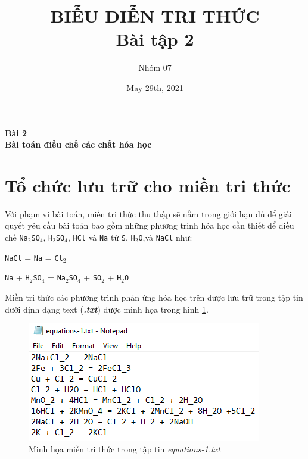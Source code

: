 \documentclass[a4paper]{article}
\title{BIỄU DIỄN TRI THỨC\\ Bài tập 2}
\author{Nhóm 07}
\date{May 29th, 2021}
\begin{document}
	\maketitle
	\begin{center}
		\LARGE{\textbf{Bài 2\\Bài toán điều chế các chất hóa học}}
	\end{center}
	
	\section{Tổ chức lưu trữ cho miền tri thức} 	
	
	Với phạm vi bài toán, miền tri thức thu thập sẽ nằm trong giới hạn đủ để giải quyết yêu cầu bài toán bao gồm những phương trinh hóa học cần thiết để điều chế \texttt{Na$_2$SO$_4$}, \texttt{H$_2$SO$_4$}, \texttt{HCl} và \texttt{Na} từ \texttt{S}, \texttt{H$_2$O},và \texttt{NaCl} như:
	
	\texttt{NaCl} = \texttt{Na} = \texttt{Cl$_2$}  
	
	\texttt{Na} + \texttt{H$_2$SO$_4$} = \texttt{Na$_2$SO$_4$} + \texttt{SO$_2$} + \texttt{H$_2$O}
	
	Miền tri thức các phương trình phản ứng hóa học trên được lưu trữ trong tập tin dưới định dạng text (\textbf{\textit{.txt}}) được minh họa trong hình \ref{fig-2a:mien-tri-thuc}. 
	\begin{figure}[h]
		\centering
		\includegraphics[width=0.7\linewidth]{images/2a_mien-tri-thuc}
		\caption{Minh họa miền tri thức trong tập tin \textit{equations-1.txt}}
		\label{fig-2a:mien-tri-thuc}
	\end{figure}
	
\end{document}
